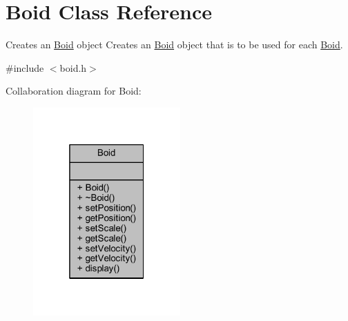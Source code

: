 \hypertarget{class_boid}{\section{Boid Class Reference}
\label{class_boid}
}


Creates an \hyperlink{class_boid}{Boid} object Creates an \hyperlink{class_boid}{Boid} object that is to be used for each \hyperlink{class_boid}{Boid}.  




{\ttfamily \#include $<$boid.\+h$>$}



Collaboration diagram for Boid\+:\nopagebreak
\begin{figure}[H]
\begin{center}
\leavevmode
\includegraphics[width=160pt]{class_boid__coll__graph}
\end{center}
\end{figure}
